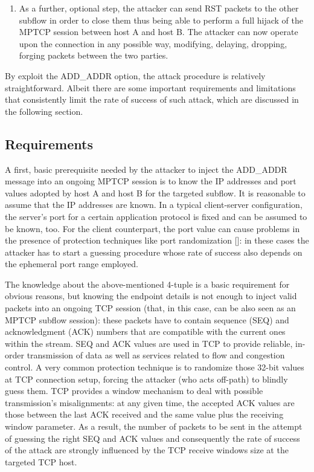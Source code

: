 \begin{enumerate}
\item As a further, optional step, the attacker can send RST packets to the other subflow in order to close them thus being able to perform a full hijack of the MPTCP session between host A and host B. The attacker can now operate upon the connection in any possible way, modifying, delaying, dropping, forging packets between the two parties.
\end{enumerate}

By exploit the ADD\_ADDR option, the attack procedure is relatively straightforward. Albeit there are some important requirements and limitations that consistently limit the rate of success of such attack, which are discussed in the following section.

\subsection{Requirements}
A first, basic prerequisite needed by the attacker to inject the ADD\_ADDR message into an ongoing MPTCP session is to know the IP addresses and port values adopted by host A and host B for the targeted subflow. It is reasonable to assume that the IP addresses are known. In a typical client-server configuration, the server's port for a certain application protocol is fixed and can be assumed to be known, too. For the client counterpart, the port value can cause problems in the presence of protection techniques like port randomization []: in these cases the attacker has to start a guessing procedure whose rate of success also depends on the ephemeral port range employed.

The knowledge about the above-mentioned 4-tuple is a basic requirement for obvious reasons, but knowing the endpoint details is not enough to inject valid packets into an ongoing TCP session (that, in this case, can be also seen as an MPTCP subflow session): these packets have to contain sequence (SEQ) and acknowledgment (ACK) numbers that are compatible with the current ones within the stream. SEQ and ACK values are used in TCP to provide reliable, in-order transmission of data as well as services related to flow and congestion control. A very common protection technique is to randomize those 32-bit values at TCP connection setup, forcing the attacker (who acts off-path) to blindly guess them. TCP provides a window mechanism to deal with possible transmission's misalignments: at any given time, the accepted ACK values are those between the last ACK received and the same value plus the receiving window parameter. As a result, the number of packets to be sent in the attempt of guessing the right SEQ and ACK values and consequently the rate of success of the attack are strongly influenced by the TCP receive windows size at the targeted TCP host.

